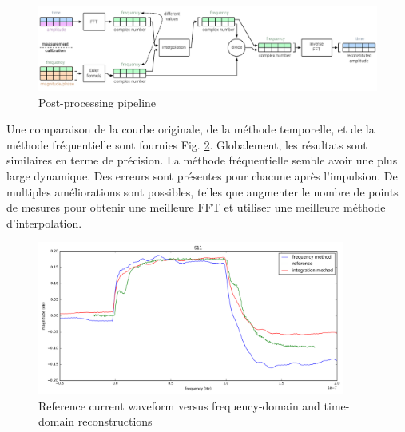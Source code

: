 \begin{figure}[!h]
  \centering
  \includegraphics[width=\textwidth]{src/1/figures/frequency_post_process_flow.pdf}
  \caption{Post-processing pipeline}
  \label{fig:postprocess-nfs-pipeline}
\end{figure}

Une comparaison de la courbe originale, de la méthode temporelle, et de la méthode fréquentielle sont fournies Fig. \ref{fig:freq-domain-reconstructed}.
Globalement, les résultats sont similaires en terme de précision.
La méthode fréquentielle semble avoir une plus large dynamique.
Des erreurs sont présentes pour chacune après l'impulsion.
De multiples améliorations sont possibles, telles que augmenter le nombre de points de mesures pour obtenir une meilleure FFT et utiliser une meilleure méthode d'interpolation.

\begin{figure}[!h]
  \centering
  \includegraphics[width=0.9\textwidth]{src/1/figures/final_comparison_reconstructions.png}
  \caption{Reference current waveform versus frequency-domain and time-domain reconstructions}
  \label{fig:freq-domain-reconstructed}
\end{figure}
